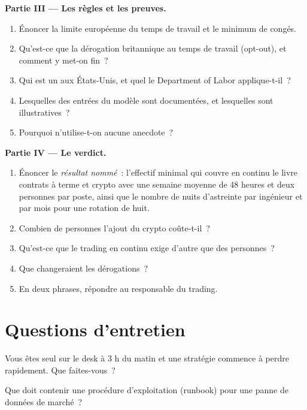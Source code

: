 \begin{problem}
\medskip\noindent\textbf{Partie III --- Les règles et les preuves.}
\begin{enumerate}[resume]
\item Énoncer la limite européenne du temps de travail et le minimum de congés.
\item Qu'est-ce que la dérogation britannique au temps de travail (opt-out), et comment y met-on fin~?
\item Qui est un  aux États-Unis, et quel  le Department of Labor applique-t-il~?
\item Lesquelles des entrées du modèle sont documentées, et lesquelles sont illustratives~?
\item Pourquoi n'utilise-t-on aucune anecdote~?
\end{enumerate}

\medskip\noindent\textbf{Partie IV --- Le verdict.}
\begin{enumerate}[resume]
\item Énoncer le \emph{résultat nommé}~: l'effectif minimal qui couvre en continu le livre contrats à terme et crypto
avec une semaine moyenne de 48 heures et deux personnes par poste, ainsi que le nombre de nuits d'astreinte par ingénieur et par mois pour une rotation de huit.
\item Combien de personnes l'ajout du crypto coûte-t-il~?
\item Qu'est-ce que le trading en continu exige d'autre que des personnes~?
\item Que changeraient les dérogations~?
\item En deux phrases, répondre au responsable du trading.
\end{enumerate}
\end{problem}

\section{Questions d'entretien}

\begin{interviewq}\label{iq:in:hours-rhythm-and-intensity:1}
Vous êtes seul sur le desk à 3 h du matin et une stratégie commence à perdre rapidement. Que faites-vous~?
\end{interviewq}

\begin{interviewq}\label{iq:in:hours-rhythm-and-intensity:2}
Que doit contenir une procédure d'exploitation (runbook) pour une panne de données de marché~?
\end{interviewq}

